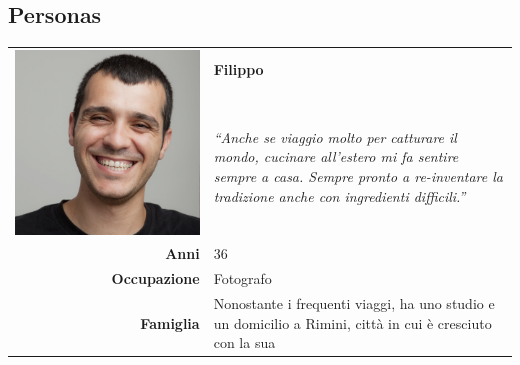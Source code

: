 \subsection{Personas}
\begin{table}[H]
	\begin{centering}
	\begin{tabular} { | r  p{10cm} | }
		\hline
		\multirow{2}{*}{
			\begin{minipage}{.18 \textheight}
				\vspace{0.1in}
				\includegraphics[width=\linewidth]{img/personas/filippo.png}
			\end{minipage}
		}
		 & \vspace{0.1 in}\Large\textbf{Filippo} \\ 
		& \vspace{0.1 in}\large{\emph{``Anche se viaggio molto per catturare il mondo,
cucinare all'estero mi fa
		sentire sempre a casa. Sempre pronto a re-inventare la tradizione anche con
		ingredienti difficili.''}}\\[8ex] 
		\hline
		\textbf{Anni} & 36 \\ \hline
		\textbf{Occupazione} & Fotografo \\ \hline
		\textbf{Famiglia} & {Nonostante i frequenti viaggi, ha uno
studio e un domicilio a Rimini, città in cui è cresciuto con la sua
}
\end{tabular}
\end{centering}
\end{table}
